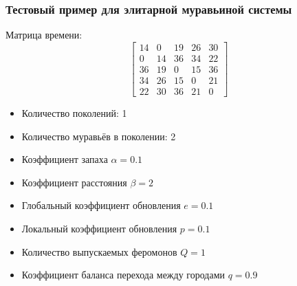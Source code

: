 \documentclass[14pt]{article}
\begin{document}
\subsubsection{Тестовый пример для элитарной муравьиной системы}

Матрица времени:
\[
\begin{bmatrix}
14 & 0 & 19 & 26 & 30 \\
0 & 14 & 36 & 34 & 22 \\
36 & 19 & 0 & 15 & 36 \\
34 & 26 & 15 & 0 & 21 \\
22 & 30 & 36 & 21 & 0
\end{bmatrix}
\]


\begin{itemize}
    \item Количество поколений: 1
    \item Количество муравьёв в поколении: 2
    \item Коэффициент запаха $\alpha = 0.1$
    \item Коэффициент расстояния $\beta = 2$
    \item Глобальный коэффициент обновления $e = 0.1$
    \item Локальный коэффициент обновления $p = 0.1$
    \item Количество выпускаемых феромонов $Q = 1$
    \item Коэффициент баланса перехода между городами $q = 0.9$
\end{itemize}
\end{document}
